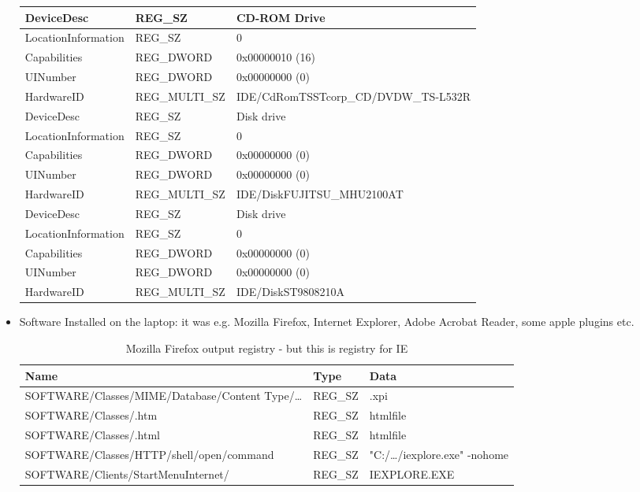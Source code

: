 \documentclass[5pt]{article}
\begin{document}
\begin{itemize}
\begin{table}[ht]
\begin{tabular}{|l|l|l|}
  DeviceDesc &	REG\_SZ &	CD-ROM Drive  \\
  \hline
LocationInformation &	REG\_SZ &	0 \\
\hline
Capabilities &	REG\_DWORD &	0x00000010 (16) \\
\hline
UINumber &	REG\_DWORD &	0x00000000 (0) \\
\hline
HardwareID &	REG\_MULTI\_SZ &	IDE/CdRomTSSTcorp\_CD/DVDW\_TS-L532R \\
\hline
\hline 	
DeviceDesc &	REG\_SZ &	Disk drive \\
\hline 	
LocationInformation &	REG\_SZ &	0 \\
\hline
Capabilities &	REG\_DWORD &	0x00000000 (0) \\
\hline
UINumber &	REG\_DWORD &	0x00000000 (0) \\
\hline
HardwareID &	REG\_MULTI\_SZ &	IDE/DiskFUJITSU\_MHU2100AT\\
\hline
\hline 	 	
DeviceDesc &	REG\_SZ &	Disk drive \\
\hline 	
LocationInformation &	REG\_SZ &	0 \\
\hline 	
Capabilities &	REG\_DWORD &	0x00000000 (0) \\
\hline
UINumber &	REG\_DWORD &	0x00000000 (0) \\
\hline
HardwareID &	REG\_MULTI\_SZ &	IDE/DiskST9808210A\\
\hline  
  
  \end{tabular}
  \label{tab:periphTab}
\end{table}




\item Software Installed on the laptop: it was e.g. Mozilla Firefox, Internet
Explorer, Adobe Acrobat Reader, some apple plugins etc. 

\begin{table}[ht]
  \centering
  \caption{Mozilla Firefox output registry - but this is registry for IE}
  \begin{tabular}{|l|l|l|}
  \hline
  Name & Type & Data\\
  \hline
  \hline
  SOFTWARE/Classes/MIME/Database/Content
  Type/\ldots &	REG\_SZ &	.xpi  \\
  \hline
SOFTWARE/Classes/.htm &	REG\_SZ &	htmlfile  \\
\hline
SOFTWARE/Classes/.html &	REG\_SZ &	htmlfile  \\
\hline
SOFTWARE/Classes/HTTP/shell/open/command &	REG\_SZ & 	"C:/\ldots/iexplore.exe" -nohome\\
\hline
SOFTWARE/Clients/StartMenuInternet/ &	REG\_SZ &	IEXPLORE.EXE  \\
\hline
  

\end{tabular}
\end{table}
\end{itemize}
\end{document}
